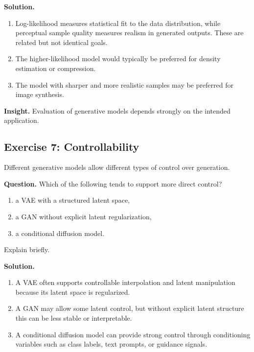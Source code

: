 \medskip

\noindent
\textbf{Solution.}
\begin{enumerate}
    \item Log-likelihood measures statistical fit to the data distribution, while perceptual sample quality measures realism in generated outputs. These are related but not identical goals.

    \item The higher-likelihood model would typically be preferred for density estimation or compression.

    \item The model with sharper and more realistic samples may be preferred for image synthesis.
\end{enumerate}

\medskip

\noindent
\textbf{Insight.}  
Evaluation of generative models depends strongly on the intended application.

\subsection{Exercise 7: Controllability}

Different generative models allow different types of control over generation.

\medskip

\noindent
\textbf{Question.}  
Which of the following tends to support more direct control?

\begin{enumerate}
    \item a VAE with a structured latent space,
    \item a GAN without explicit latent regularization,
    \item a conditional diffusion model.
\end{enumerate}

Explain briefly.

\medskip

\noindent
\textbf{Solution.}

\begin{enumerate}
    \item A VAE often supports controllable interpolation and latent manipulation because its latent space is regularized.

    \item A GAN may allow some latent control, but without explicit latent structure this can be less stable or interpretable.

    \item A conditional diffusion model can provide strong control through conditioning variables such as class labels, text prompts, or guidance signals.
\end{enumerate}

